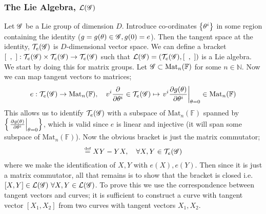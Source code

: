 \subsubsection{The Lie Algebra, $\lie{\group}$}
Let $\mathscr{G}$ be a Lie group of dimension $D$. Introduce co-ordinates $\set{\theta^i}$ in some region containing the identity ($g = g(\theta) \in \mathscr{G}, g(0) = e$). Then the tangent space at the identity, $\mathcal{T}_e(\mathscr{G})$ is $D$-dimensional vector space. We can define a bracket $[\,\,\,,\,\,] : \mathcal{T}_e(\mathscr{G}) \times \mathcal{T}_e(\mathscr{G}) \rightarrow \mathcal{T}_e(\mathscr{G})$ such that $\lie{\group} = \left(\TeG, [\,\,\,,\,\,]\right)$ is a Lie algebra. We start by doing this for matrix groups. Let $\mathscr{G} \subset \text{Mat}_n(\mathbb{F})$ for some $n \in \mathbb{N}$. Now we can map tangent vectors to matrices;
\begin{equation}
e : \TeG \rightarrow \text{Mat}_n(\mathbb{F}), \quad v^i \frac{\del}{\del \theta^i} \in \TeG \mapsto \left.v^i \frac{\del g(\theta)}{\del \theta^i}\right|_{\theta = 0} \in \text{Mat}_n(\mathbb{F})
\end{equation}
This allows us to identify $\mathcal{T}_e(\mathscr{G})$ with a subspace of $\text{Mat}_n(\mathbb{F})$ spanned by $\set{\left.\tfrac{\del g(\theta)}{\del \theta^i}\right|_{\theta = 0}}$, which is valid since $e$ is linear and injective (it will span some subspace of $\text{Mat}_n(\mathbb{F})$). Now the obvious bracket is just the matrix commutator;
\begin{equation}
[X, Y] \overset{\textrm{\tiny def}}{=} XY - YX, \quad \forall X, Y \in \TeG
\end{equation}
where we make the identification of $X, Y$ with $e(X), e(Y)$. Then since it is just a matrix commutator, all that remains is to show that the bracket is closed i.e. $[X, Y] \in \lie{\group} \,\,\forall X, Y \in \lie{\group}$\footnotemark. To prove this we use the correspondence between tangent vectors and curves; it is sufficient to construct a curve with tangent vector $[X_1, X_2]$ from two curves with tangent vectors $X_1, X_2$.

